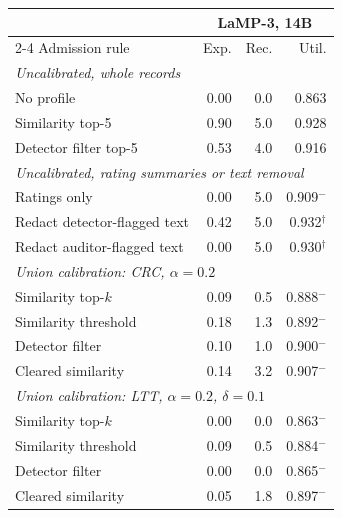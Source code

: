 \begin{tabular}{lrrr}
\toprule
 & \multicolumn{3}{c}{LaMP-3, 14B} \\
\cmidrule(lr){2-4}
Admission rule & Exp. & Rec. & Util. \\
\midrule
\multicolumn{4}{l}{\emph{Uncalibrated, whole records}} \\
No profile & 0.00 & 0.0 & 0.863 \\
Similarity top-5 & 0.90 & 5.0 & 0.928 \\
Detector filter top-5 & 0.53 & 4.0 & 0.916 \\
\midrule
\multicolumn{4}{l}{\emph{Uncalibrated, rating summaries or text removal}} \\
Ratings only & 0.00 & 5.0 & 0.909$^{-}$ \\
Redact detector-flagged text & 0.42 & 5.0 & 0.932$^{\dagger}$ \\
Redact auditor-flagged text & 0.00 & 5.0 & 0.930$^{\dagger}$ \\
\midrule
\multicolumn{4}{l}{\emph{Union calibration: CRC, $\alpha=0.2$}} \\
Similarity top-$k$ & 0.09 & 0.5 & 0.888$^{-}$ \\
Similarity threshold & 0.18 & 1.3 & 0.892$^{-}$ \\
Detector filter & 0.10 & 1.0 & 0.900$^{-}$ \\
Cleared similarity & 0.14 & 3.2 & 0.907$^{-}$ \\
\midrule
\multicolumn{4}{l}{\emph{Union calibration: LTT, $\alpha=0.2$, $\delta=0.1$}} \\
Similarity top-$k$ & 0.00 & 0.0 & 0.863$^{-}$ \\
Similarity threshold & 0.09 & 0.5 & 0.884$^{-}$ \\
Detector filter & 0.00 & 0.0 & 0.865$^{-}$ \\
Cleared similarity & 0.05 & 1.8 & 0.897$^{-}$ \\
\bottomrule
\end{tabular}
